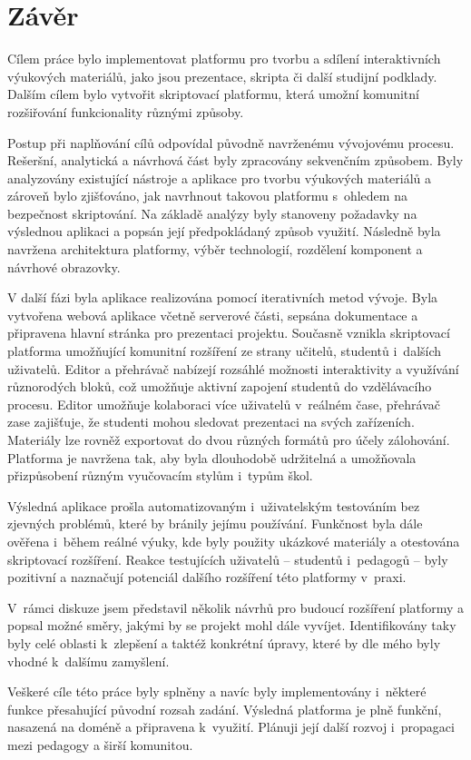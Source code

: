 \chapter*{Závěr}


Cílem práce bylo implementovat platformu pro tvorbu a sdílení interaktivních výukových materiálů, jako jsou prezentace, skripta či další studijní podklady. 
Dalším cílem bylo vytvořit skriptovací platformu, která umožní komunitní rozšiřování funkcionality různými způsoby.

Postup při naplňování cílů odpovídal původně navrženému vývojovému procesu. Rešeršní, analytická a návrhová část byly zpracovány sekvenčním způsobem. 
Byly analyzovány existující nástroje a aplikace pro tvorbu výukových materiálů a zároveň bylo zjišťováno, jak navrhnout takovou platformu s~ohledem na bezpečnost skriptování.
Na základě analýzy byly stanoveny požadavky na výslednou aplikaci a popsán její předpokládaný způsob využití. 
Následně byla navržena architektura platformy, výběr technologií, rozdělení komponent a návrhové obrazovky.

V další fázi byla aplikace realizována pomocí iterativních metod vývoje.
Byla vytvořena webová aplikace včetně serverové části, sepsána dokumentace a připravena hlavní stránka pro prezentaci projektu.
Současně vznikla skriptovací platforma umožňující komunitní rozšíření ze strany učitelů, studentů i~dalších uživatelů.
Editor a přehrávač nabízejí rozsáhlé možnosti interaktivity a využívání různorodých bloků, což umožňuje aktivní zapojení studentů do vzdělávacího procesu.
Editor umožňuje kolaboraci více uživatelů v~reálném čase, přehrávač zase zajišťuje, že studenti mohou sledovat prezentaci na svých zařízeních.
Materiály lze rovněž exportovat do dvou různých formátů pro účely zálohování. Platforma je navržena tak, aby byla dlouhodobě udržitelná a umožňovala přizpůsobení různým vyučovacím stylům i~typům škol.

Výsledná aplikace prošla automatizovaným i~uživatelským testováním bez zjevných problémů, které by bránily jejímu používání. 
Funkčnost byla dále ověřena i~během reálné výuky, kde byly použity ukázkové materiály a otestována skriptovací rozšíření. 
Reakce testujících uživatelů -- studentů i~pedagogů -- byly pozitivní a naznačují potenciál dalšího rozšíření této platformy v~praxi.

V~rámci diskuze jsem představil několik návrhů pro budoucí rozšíření platformy a popsal možné směry, jakými by se projekt mohl dále vyvíjet.
Identifikovány taky byly celé oblasti k~zlepšení a taktéž konkrétní úpravy, které by dle mého byly vhodné k~dalšímu zamyšlení.

Veškeré cíle této práce byly splněny a navíc byly implementovány i~některé funkce přesahující původní rozsah zadání.
Výsledná platforma je plně funkční, nasazená na doméně a připravena k~využití. 
Plánuji její další rozvoj i~propagaci mezi pedagogy a širší komunitou.
